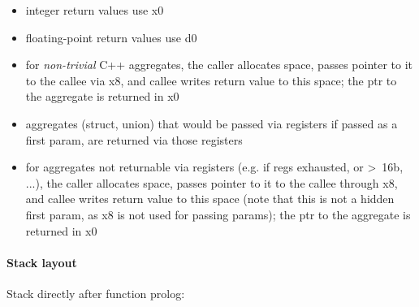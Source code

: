 \begin{itemize}
\item integer return values use x0
\item floating-point return values use d0
\item for {\it non-trivial} C++ aggregates, the caller allocates space, passes pointer to it to the callee via x8, and callee writes return value to this space; the ptr to the aggregate is returned in x0
\item aggregates (struct, union) that would be passed via registers if passed as a first param, are returned via those registers
\item for aggregates not returnable via registers (e.g. if regs exhausted, or \textgreater\ 16b, ...), the caller allocates space, passes pointer to it to the callee through
x8, and callee writes return value to this space (note that this is not a hidden first param, as x8 is not used for passing params); the ptr to the aggregate is returned in x0
\end{itemize}

\paragraph{Stack layout}

Stack directly after function prolog:\\


